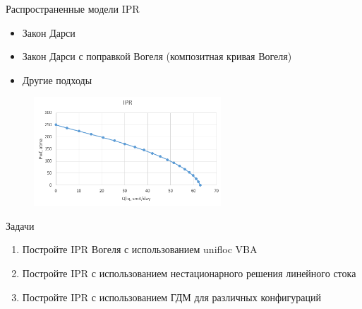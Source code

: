 \documentclass[aspectratio=169, 11pt]{beamer} %
\begin{document}
\begin{frame}{Распространенные модели IPR}
	
	\begin{itemize}
		\item Закон Дарси
		\item Закон Дарси с поправкой Вогеля (композитная кривая Вогеля)
		\item Другие подходы
	\end{itemize}
	
	\begin{figure}[h!]
		\begin{center}
			\includegraphics[width=7cm]{pics/ipr_1.png}
			\label{ris:ipr_1}
		\end{center}
	\end{figure}
	
\end{frame}

\begin{frame}{Задачи}
	
	\begin{enumerate}
		\item Постройте IPR Вогеля с использованием unifloc VBA
		\item Постройте IPR с использованием нестационарного решения линейного стока
		\item Постройте IPR с использованием ГДМ для различных конфигураций
	\end{enumerate}
	

	
\end{frame}


%
\end{document}
